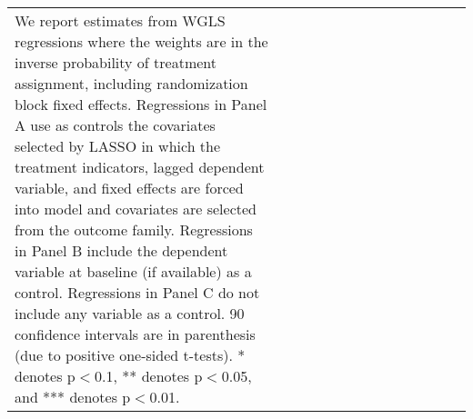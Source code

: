 \begin{table}[H]
\begin{tabular}{@{\extracolsep{0pt}}lccccccccccccc}
{{  We report estimates from WGLS regressions where the weights are in the inverse probability of treatment 
  assignment, including randomization block fixed effects. 
  Regressions in Panel A use as controls the covariates selected by LASSO in which the treatment indicators,
  lagged dependent variable, and fixed effects are forced into model and covariates are selected from the outcome family.
  Regressions in Panel B include the dependent variable at baseline (if available) as a control. 
  Regressions in Panel C do not include any variable as a control. 
  90\14 confidence intervals are in parenthesis (due to positive one-sided t-tests). 
  * denotes p$<$0.1, ** denotes p$<$0.05, and *** denotes p$<$0.01.}} \\\end{tabular} \end{table} 